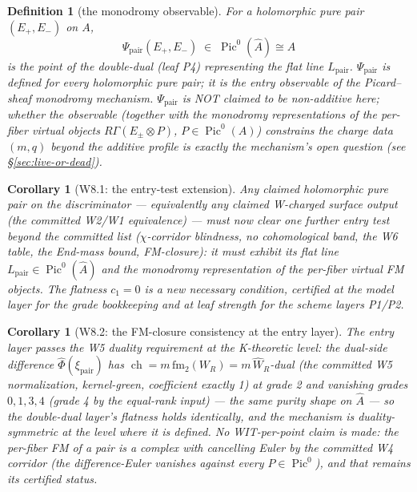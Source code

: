 \documentclass[11pt]{article}
\newtheorem{corollary}[lemma]{Corollary}
\newtheorem{definition}[lemma]{Definition}
\newcommand{\WR}{W_R}
\newcommand{\ch}{\operatorname{ch}}
\newcommand{\Pic}{\operatorname{Pic}}
\newcommand{\KA}{A}
\newcommand{\KAd}{\widehat{A}}
\begin{document}
\begin{definition}[the monodromy observable]
\label{def:Psi}
For a holomorphic pure pair $(E_+,E_-)$ on $\KA$,
\[
\Psi_{\mathrm{pair}}(E_+,E_-) \;\in\; \Pic^0(\KAd) \cong \KA
\]
is the point of the double-dual (leaf P4) representing the flat line
$L_{\mathrm{pair}}$. $\Psi_{\mathrm{pair}}$ is defined for every
holomorphic pure pair; it is the entry observable of the Picard--sheaf
monodromy mechanism. $\Psi_{\mathrm{pair}}$ is NOT claimed to be
non-additive here; whether the observable (together with the monodromy
representations of the per-fiber virtual objects
$R\Gamma(E_\pm\otimes P)$, $P\in\Pic^0(\KA)$) constrains the charge data
$(m,q)$ beyond the additive profile is exactly the mechanism's open
question (see \S\ref{sec:live-or-dead}).
\end{definition}

\begin{corollary}[W8.1: the entry-test extension]
\label{cor:W81}
Any claimed holomorphic pure pair on the discriminator --- equivalently any
claimed W-charged surface output (the committed W2/W1 equivalence) --- must
now clear one further entry test beyond the committed list
($\chi$-corridor blindness, no cohomological band, the W6 table, the End-mass
bound, FM-closure): it must exhibit its flat line
$L_{\mathrm{pair}}\in\Pic^0(\KAd)$ and the monodromy representation of the
per-fiber virtual FM objects. The flatness $c_1 = 0$ is a new necessary
condition, certified at the model layer for the grade bookkeeping and at
leaf strength for the scheme layers P1/P2.
\end{corollary}

\begin{corollary}[W8.2: the FM-closure consistency at the entry layer]
\label{cor:W82}
The entry layer passes the W5 duality requirement at the K-theoretic level:
the dual-side difference $\widehat\Phi(\xi_{\mathrm{pair}})$ has
$\ch = m\,\mathrm{fm}_2(\WR) = m\,\widehat\WR$-dual (the committed W5
normalization, kernel-green, coefficient exactly 1) at grade 2 and
vanishing grades $0,1,3,4$ (grade 4 by the equal-rank input) --- the same
purity shape on $\KAd$ --- so the
double-dual layer's flatness holds identically, and the mechanism is
duality-symmetric at the level where it is defined. No WIT-per-point claim
is made: the per-fiber FM of a pair is a complex with cancelling Euler by
the committed W4 corridor (the difference-Euler vanishes against every
$P\in\Pic^0$), and that remains its certified status.
\end{corollary}
\end{document}
